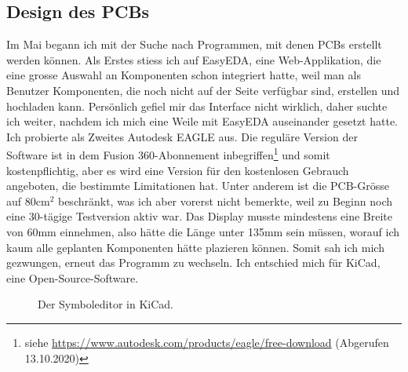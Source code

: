 \documentclass[12pt, a4paper]{report}
\begin{document}
\subsection{Design des PCBs}
Im Mai begann ich mit der Suche nach Programmen, mit denen PCBs erstellt werden können. Als Erstes stiess ich auf EasyEDA, eine Web-Applikation, die eine grosse Auswahl an Komponenten schon integriert hatte, weil man als Benutzer Komponenten, die noch nicht auf der Seite verfügbar sind, erstellen und hochladen kann. Persönlich gefiel mir das Interface nicht wirklich, daher suchte ich weiter, nachdem ich mich eine Weile mit EasyEDA auseinander gesetzt hatte.
\\[\medskipamount]
Ich probierte als Zweites Autodesk EAGLE aus. Die reguläre Version der Software ist in dem Fusion 360-Abonnement inbegriffen\footnote{siehe \url{https://www.autodesk.com/products/eagle/free-download} (Abgerufen 13.10.2020)} und somit kostenpflichtig, aber es wird eine Version für den kostenlosen Gebrauch angeboten, die bestimmte Limitationen hat. Unter anderem ist die PCB-Grösse auf $80\textrm{cm}^2$ beschränkt, was ich aber vorerst nicht bemerkte, weil zu Beginn noch eine 30-tägige Testversion aktiv war. Das Display musste mindestens eine Breite von 60mm einnehmen, also hätte die Länge unter 135mm sein müssen, worauf ich kaum alle geplanten Komponenten hätte plazieren können. Somit sah ich mich gezwungen, erneut das Programm zu wechseln. Ich entschied mich für KiCad, eine Open-Source-Software.
\\[\medskipamount]
\begin{figure}[H]
	\centering
	\caption{Der Symboleditor in KiCad.}
	\label{fig:symboleditor}
\end{figure}
\end{document}
